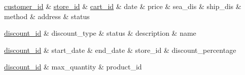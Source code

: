 \documentclass[a4paper, 12pt]{article}
\begin{document}
\newline
\begin{dependency}
    \begin{deptext}[TxtBook] %
        \underline{customer_id} \& \underline{store_id} \& \underline{cart_id} \& date \& price \& sea_dis \& ship_dis \& method \& address \& status \\
    \end{deptext}
\end{dependency}

\newline
\begin{dependency}
    \begin{deptext}[TxtBook] %
        \underline{discount_id} \& discount_type \& status \& description \& name \\
    \end{deptext}
\end{dependency}

\newline
\begin{dependency}
    \begin{deptext}[TxtBook] %
        \underline{discount_id} \& start_date \& end_date \& store_id \& discount_percentage\\
    \end{deptext}
\end{dependency}

\newline
\begin{dependency}
    \begin{deptext}[TxtBook] %
        \underline{discount_id} \& max_quantity \& product_id \\
    \end{deptext}
\end{dependency}
\end{document}
